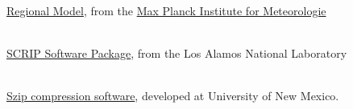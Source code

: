 \begin{thebibliography}{xx}
\label{REMO}
 \ \\
  \href{http://www.mpimet.mpg.de/en/wissenschaft/ueberblick/atmosphaere-im-erdsystem/regionale-klimamodellierung.html}
       {Regional Model},
  from the
  \href{http://www.mpimet.mpg.de}
       {Max Planck Institute for Meteorologie}

\label{SCRIP}
 \ \\
  \href{http://climate.lanl.gov/Software/SCRIP}{SCRIP Software Package},
  from the Los Alamos National Laboratory

\label{szip}
 \ \\
  \href{http://hdf.ncsa.uiuc.edu/doc_resource/SZIP}{Szip compression software},
  developed at University of New Mexico.

\end{thebibliography}
